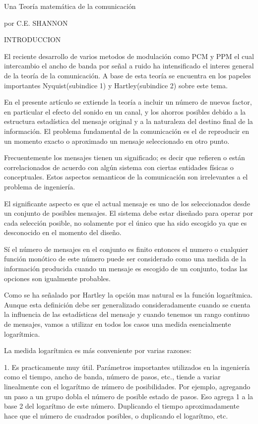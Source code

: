 Una Teoría matemática de la comunicación

por C.E. SHANNON

INTRODUCCION

El reciente desarrollo de varios metodos de modulación como PCM y PPM
el cual intercambio el ancho de banda por señal a ruido ha
intensificado el interes general de la teoría de la comunicación. A
base de esta teoría se encuentra en los papeles importantes
Nyquist(subindice 1) y Hartley(subindice 2) sobre este tema. 

En el presente artículo se extiende la teoría a incluir un número de
nuevos factor, en particular el efecto del sonido en un canal, y los
ahorros posibles debido a la estructura estadística del mensaje
original y a la naturaleza del destino final de la información. El
problema fundamental de la comunicación es el de reproducir en un
momento exacto o aproximado un mensaje seleccionado en otro punto.

Frecuentemente los mensajes tienen un significado; es decir que
refieren o están correlacionados de acuerdo con algún sistema con
ciertas entidades físicas o conceptuales. Estos aspectos semanticos de
la comunicación son irrelevantes a el problema de ingeniería. 

El significante aspecto es que el actual mensaje es uno de los
seleccionados desde un conjunto de posibles mensajes. El sistema debe
estar diseñado para operar por cada selección posible, no solamente
por el
único que ha sido escogido ya que es desconocido en el momento del
diseño.

Sí el número de mensajes en el conjunto es finito entonces el numero o
cualquier función monótico de este número puede ser considerado como
una medida de la información producida cuando un mensaje es escogido
de un conjunto, todas las opciones son igualmente probables. 

Como se ha señalado por Hartley la opción mas natural es la función
logarítmica. Aunque esta definición debe ser generalizado
consideradamente cuando se cuenta la influencia de las estadísticas
del mensaje y cuando tenemos un rango continuo de mensajes, vamos a
utilizar en todos los casos una medida esencialmente logarítmica.

La medida logarítmica es más conveniente por varias razones:

1. Es practicamente muy útil. Parámetros importantes utilizados en la
ingeniería como el tiempo, ancho de banda, número de pasos, etc.,
tiende a variar linealmente con el logarítmo de número de
posibilidades. Por ejemplo, agregando un paso a un grupo dobla el
número de posible estado de pasos. Eso agrega 1 a la base 2 del
logarítmo de este número. Duplicando el tiempo aproximadamente hace
que el número de cuadrados posibles, o duplicando el logarítmo, etc.

